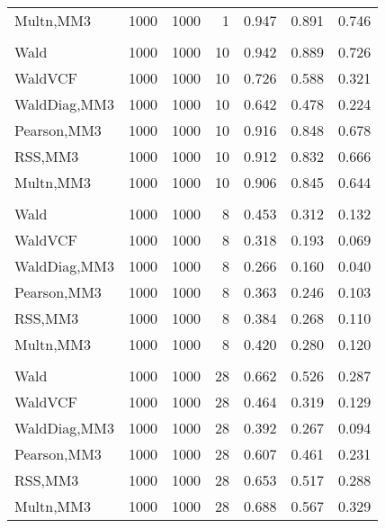 \documentclass[
]{article}
\begin{document}
\begin{table}[H]
{\begin{tabular}[t]{lrrrrrr}
\hspace{1em}Multn,MM3 & 1000 & 1000 & 1 & 0.947 & 0.891 & 0.746\\
\addlinespace[0.3em]
\multicolumn{7}{l}{\textbf{1F 15V}}\\
\hspace{1em}Wald & 1000 & 1000 & 10 & 0.942 & 0.889 & 0.726\\
\hspace{1em}WaldVCF & 1000 & 1000 & 10 & 0.726 & 0.588 & 0.321\\
\hspace{1em}WaldDiag,MM3 & 1000 & 1000 & 10 & 0.642 & 0.478 & 0.224\\
\hspace{1em}Pearson,MM3 & 1000 & 1000 & 10 & 0.916 & 0.848 & 0.678\\
\hspace{1em}RSS,MM3 & 1000 & 1000 & 10 & 0.912 & 0.832 & 0.666\\
\hspace{1em}Multn,MM3 & 1000 & 1000 & 10 & 0.906 & 0.845 & 0.644\\
\addlinespace[0.3em]
\multicolumn{7}{l}{\textbf{2F 10V}}\\
\hspace{1em}Wald & 1000 & 1000 & 8 & 0.453 & 0.312 & 0.132\\
\hspace{1em}WaldVCF & 1000 & 1000 & 8 & 0.318 & 0.193 & 0.069\\
\hspace{1em}WaldDiag,MM3 & 1000 & 1000 & 8 & 0.266 & 0.160 & 0.040\\
\hspace{1em}Pearson,MM3 & 1000 & 1000 & 8 & 0.363 & 0.246 & 0.103\\
\hspace{1em}RSS,MM3 & 1000 & 1000 & 8 & 0.384 & 0.268 & 0.110\\
\hspace{1em}Multn,MM3 & 1000 & 1000 & 8 & 0.420 & 0.280 & 0.120\\
\addlinespace[0.3em]
\multicolumn{7}{l}{\textbf{3F 15V}}\\
\hspace{1em}Wald & 1000 & 1000 & 28 & 0.662 & 0.526 & 0.287\\
\hspace{1em}WaldVCF & 1000 & 1000 & 28 & 0.464 & 0.319 & 0.129\\
\hspace{1em}WaldDiag,MM3 & 1000 & 1000 & 28 & 0.392 & 0.267 & 0.094\\
\hspace{1em}Pearson,MM3 & 1000 & 1000 & 28 & 0.607 & 0.461 & 0.231\\
\hspace{1em}RSS,MM3 & 1000 & 1000 & 28 & 0.653 & 0.517 & 0.288\\
\hspace{1em}Multn,MM3 & 1000 & 1000 & 28 & 0.688 & 0.567 & 0.329\\
\bottomrule
\end{tabular}}
\endgroup{}
\end{table}
\end{document}
